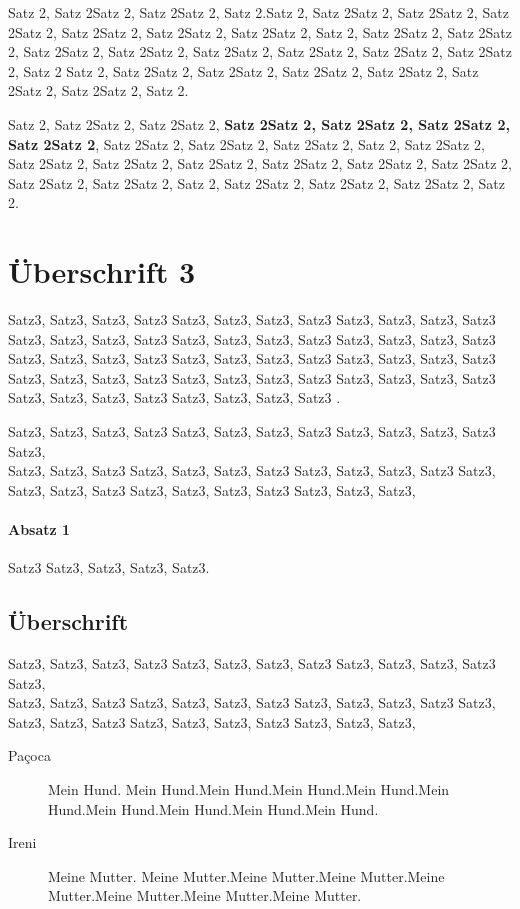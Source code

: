 \documentclass[pdftex, a4paper]{scrartcl}
\begin{document}
    Satz 2, Satz 2Satz 2, Satz 2Satz 2, Satz 2.Satz 2, Satz 2Satz 2, Satz 2Satz 2, Satz 2Satz 2, Satz 2Satz 2, Satz 2Satz 2, Satz 2Satz 2, 
    Satz 2, Satz 2Satz 2, Satz 2Satz 2, Satz 2Satz 2, Satz 2Satz 2, Satz 2Satz 2, Satz 2Satz 2, Satz 2Satz 2, Satz 2Satz 2, Satz 2
    Satz 2, Satz 2Satz 2, Satz 2Satz 2, Satz 2Satz 2, Satz 2Satz 2, Satz 2Satz 2, Satz 2Satz 2, Satz 2.


    Satz 2, Satz 2Satz 2, Satz 2Satz 2,  \textbf{Satz 2Satz 2, Satz 2Satz 2, Satz 2Satz 2, Satz 2Satz 2}, Satz 2Satz 2, Satz 2Satz 2, Satz 2Satz 2,
    Satz 2, Satz 2Satz 2, Satz 2Satz 2, Satz 2Satz 2, Satz 2Satz 2, Satz 2Satz 2, Satz 2Satz 2, Satz 2Satz 2, Satz 2Satz 2, Satz 2Satz 2, 
    Satz 2, Satz 2Satz 2, Satz 2Satz 2, Satz 2Satz 2, Satz 2.

    \section{Überschrift 3}

    Satz3, Satz3, Satz3, Satz3 Satz3, Satz3, Satz3, Satz3 Satz3, Satz3, Satz3, Satz3 Satz3, Satz3, Satz3, Satz3 Satz3, Satz3, Satz3, Satz3 
    Satz3, Satz3, Satz3, Satz3 Satz3, Satz3, Satz3, Satz3 Satz3, Satz3, Satz3, Satz3 Satz3, Satz3, Satz3, Satz3 Satz3, Satz3, Satz3, Satz3 
    Satz3, Satz3, Satz3, Satz3 Satz3, Satz3, Satz3, Satz3 Satz3, Satz3, Satz3, Satz3 Satz3, Satz3, Satz3, Satz3 .


    Satz3, Satz3, Satz3, Satz3 Satz3, Satz3, Satz3, Satz3 Satz3, Satz3, Satz3, Satz3 Satz3, \\
    Satz3, Satz3, Satz3 Satz3, Satz3, Satz3, Satz3 
    Satz3, Satz3, Satz3, Satz3 Satz3, Satz3, Satz3, Satz3 Satz3, Satz3, Satz3, Satz3 Satz3, Satz3, Satz3,
    
    \paragraph*{Absatz 1}
    Satz3 Satz3, Satz3, Satz3, Satz3.

    \subsection{Überschrift}
    Satz3, Satz3, Satz3, Satz3 Satz3, Satz3, Satz3, Satz3 Satz3, Satz3, Satz3, Satz3 Satz3, \\
    Satz3, Satz3, Satz3 Satz3, Satz3, Satz3, Satz3 
    Satz3, Satz3, Satz3, Satz3 Satz3, Satz3, Satz3, Satz3 Satz3, Satz3, Satz3, Satz3 Satz3, Satz3, Satz3,

    \begin{description}
        \item [Paçoca] Mein Hund. Mein Hund.Mein Hund.Mein Hund.Mein Hund.Mein Hund.Mein Hund.Mein Hund.Mein Hund.Mein Hund.
        \item [Ireni] Meine Mutter. Meine Mutter.Meine Mutter.Meine Mutter.Meine Mutter.Meine Mutter.Meine Mutter.Meine Mutter.
    \end{description}
    
\end{document}
